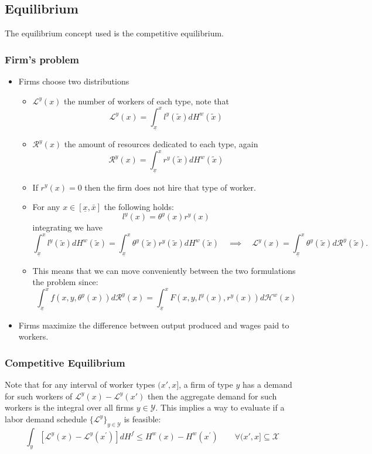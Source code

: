 \documentclass[12pt]{article}
\theoremstyle{definition}
\begin{document}
\subsection{Equilibrium}
The equilibrium concept used is the competitive equilibrium.
\subsubsection{ Firm's problem }
\begin{itemize}
    \item  Firms choose two distributions
    \begin{itemize}
        \item   $\mathcal{L}^y(x)$ the number of workers of each type, note that $$\mathcal{L}^y(x) = \int_{\underline{x}}^xl^y(\tilde{x})dH^w(\tilde{x})$$
        \item   $\mathcal{R}^y(x)$ the amount of resources dedicated to each type, again$$\mathcal{R}^y(x) = \int_{\underline{x}}^xr^y(\tilde{x})dH^w(\tilde{x})$$
            \item  If $r^y(x) = 0$ then the firm does not hire that type of worker.
        \item  For any $x\in[\underline{x}, \bar{x}]$ the following holds:$$l^y(x) = \theta^y(x)r^y(x)$$ integrating we have
        \begin{equation}\label{labor_demand}
        \int_{\underline{x}}^xl^y(\tilde{x})dH^w(\tilde{x}) = \int_{\underline{x}}^x\theta^y(\tilde{x})r^y(\tilde{x})dH^w(\tilde{x}) \quad \implies \quad \mathcal{L}^y(x) = \int_{\underline{x}}^x\theta^y(\tilde{x})d\mathcal{R}^y(\tilde{x}).
        \end{equation}
        \item This means that we can move conveniently between the two formulations the problem since:
        \[\int_{\underline{x}}^{x} f\left(x, y, \theta^{y}(x)\right) d \mathcal{R}^{y}(x) = \int_{\underline{x}}^{x} F\left(x, y, l^y(x), r^y(x)\right) d \mathcal{H}^{w}(x)\]
        \end{itemize}
    \item  Firms maximize the difference between output produced and wages paid to workers.  
\end{itemize}
\subsubsection{ Competitive Equilibrium}
Note that for any interval of worker types $(x', x]$, a firm of type $y$ has a demand for such workers of $\mathcal{L}^y(x)-\mathcal{L}^y(x')$ then the aggregate demand for such workers is the integral over all firms $y\in \mathcal{Y}$. 
This implies a way to evaluate if a labor demand schedule $\{\mathcal{L}^y\}_{y\in \mathcal{Y}}$ is feasible:$$\int_{y}\left[\mathcal{L}^{y}(x)-\mathcal{L}^{y}\left(x^{\prime}\right)\right] d H^{f} \leq H^{w}(x)-H^{w}\left(x^{\prime}\right) \qquad \forall  (x',x]\subseteq\mathcal{X}$$
\end{document}
